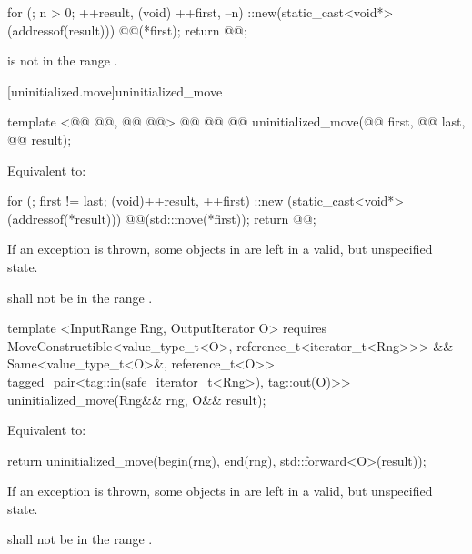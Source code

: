 \pnum
\effects {}
\begin{codeblock}
        for (; n > 0; ++result, (void) ++first, --n)
          ::new(static_cast<void*>(addressof(result)))
            @@(*first);
        return @@;
\end{codeblock}

{\color{newclr}
\pnum
\requires {} is not in the range \tcode{[first, next(first, n))}.
} %

[uninitialized.move]{uninitialized_move}
\begin{codeblock}
  template <@@ @@,
            @@ @@>
    @@
             @@
  @@
    uninitialized_move(@@ first, @@ last, @@ result);
\end{codeblock}

\setcounter{Paras}{0}
\pnum
\effects Equivalent to:
\begin{codeblock}
        for (; first != last; (void)++result, ++first)
          ::new (static_cast<void*>(addressof(*result)))
            @@(std::move(*first));
        return @@;
\end{codeblock}

\pnum
\remarks If an exception is thrown, some objects in \tcode{[first, last)} are left in a valid, but unspecified state.

{\color{newclr}
\pnum
\requires {} shall not be in the range \tcode{[first, last)}.

\begin{codeblock}
  template <InputRange Rng, OutputIterator O>
    requires MoveConstructible<value_type_t<O>, reference_t<iterator_t<Rng>>> &&
             Same<value_type_t<O>&, reference_t<O>>
  tagged_pair<tag::in(safe_iterator_t<Rng>), tag::out(O)>>
    uninitialized_move(Rng&& rng, O&& result);
\end{codeblock}

\pnum
\effects Equivalent to:
\begin{codeblock}
        return uninitialized_move(begin(rng), end(rng), std::forward<O>(result));
\end{codeblock}

\pnum
\remarks If an exception is thrown, some objects in \tcode{[first, last)} are left in a valid, but unspecified state.

\pnum
\requires {} shall not be in the range \tcode{[first, last)}.
} %

